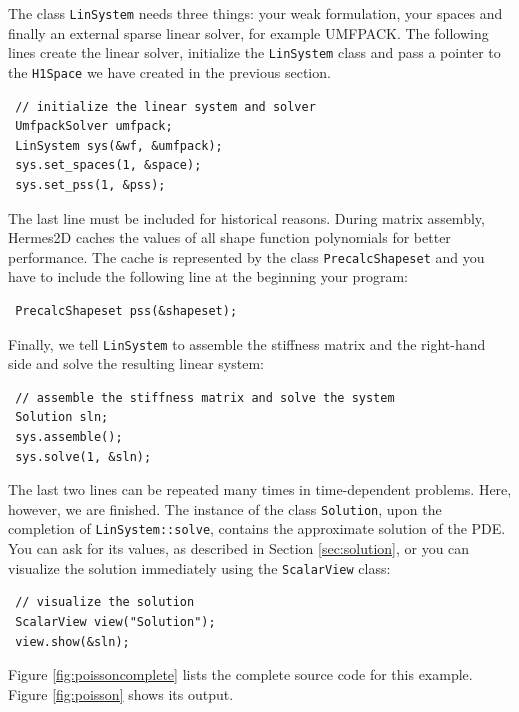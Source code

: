 The class {\tt LinSystem} needs three things: your weak formulation, your spaces and
finally an external sparse linear solver, for example UMFPACK. The following lines
create the linear solver, initialize the {\tt LinSystem} class and pass a pointer to
the {\tt H1Space} we have created in the previous section.

\begin{lstlisting}
 // initialize the linear system and solver
 UmfpackSolver umfpack;
 LinSystem sys(&wf, &umfpack);
 sys.set_spaces(1, &space);
 sys.set_pss(1, &pss);
\end{lstlisting}

The last line must be included for historical reasons. During matrix assembly,
Hermes2D caches the values of all shape function polynomials for better performance.
The cache is represented by the class {\tt PrecalcShapeset} and you have to
include the following line at the beginning your program:

\begin{lstlisting}
 PrecalcShapeset pss(&shapeset);
\end{lstlisting}

Finally, we tell {\tt LinSystem} to assemble the stiffness matrix and the right-hand
side and solve the resulting linear system: 

\begin{lstlisting}
 // assemble the stiffness matrix and solve the system
 Solution sln;
 sys.assemble();
 sys.solve(1, &sln);
\end{lstlisting}

The last two lines can be repeated many times in time-dependent problems. Here,
however, we are finished. The instance of the class {\tt Solution}, upon the
completion of {\tt LinSystem::solve}, contains the approximate solution of
the PDE. You can ask for its values, as described in Section \ref{sec:solution},
or you can visualize the solution immediately using the {\tt ScalarView} class:

\begin{lstlisting}
 // visualize the solution
 ScalarView view("Solution");
 view.show(&sln);
\end{lstlisting}

Figure \ref{fig:poissoncomplete} lists the complete source code for this example.
Figure \ref{fig:poisson} shows its output.

